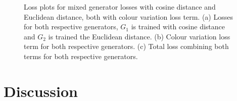   \begin{figure}[!htbp]
    \centering
    \hfill
    \hfill
    \caption[Loss plots for mixed generator losses with cosine distance and Euclidean distance, both with colour variation loss term]{Loss plots for mixed generator losses with cosine distance and Euclidean distance, both with colour variation loss term. (a) Losses for both respective generators, $G_{1}$ is trained with cosine distance and $G_{2}$ is trained the Euclidean distance. (b) Colour variation loss term for both respective generators. (c) Total loss combining both terms for both respective generators. }
    \label{fig:c3:cosine-euclid-losses}
  \end{figure}

\FloatBarrier

\section{Discussion}

